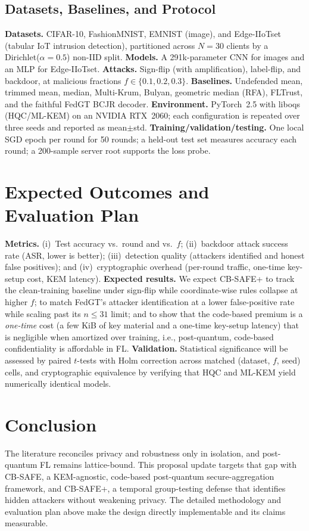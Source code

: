 \documentclass[conference]{IEEEtran}
\begin{document}
\subsection{Datasets, Baselines, and Protocol}
\textbf{Datasets.} CIFAR-10, FashionMNIST, EMNIST (image), and Edge-IIoTset (tabular
IoT intrusion detection), partitioned across $N{=}30$ clients by a
Dirichlet($\alpha{=}0.5$) non-IID split. \textbf{Models.} A 291k-parameter CNN for
images and an MLP for Edge-IIoTset. \textbf{Attacks.} Sign-flip (with amplification),
label-flip, and backdoor, at malicious fractions $f\in\{0.1,0.2,0.3\}$.
\textbf{Baselines.} Undefended mean, trimmed mean, median, Multi-Krum, Bulyan,
geometric median (RFA), FLTrust, and the faithful FedGT BCJR decoder.
\textbf{Environment.} PyTorch~2.5 with liboqs (HQC/ML-KEM) on an NVIDIA RTX~2060;
each configuration is repeated over three seeds and reported as mean$\pm$std.
\textbf{Training/validation/testing.} One local SGD epoch per round for 50 rounds; a
held-out test set measures accuracy each round; a 200-sample server root supports the
loss probe.

\section{Expected Outcomes and Evaluation Plan}
\textbf{Metrics.} (i)~Test accuracy vs.\ round and vs.\ $f$; (ii)~backdoor attack
success rate (ASR, lower is better); (iii)~detection quality (attackers identified
and honest false positives); and (iv)~cryptographic overhead (per-round traffic,
one-time key-setup cost, KEM latency). \textbf{Expected results.} We expect CB-SAFE+
to track the clean-training baseline under sign-flip while coordinate-wise rules
collapse at higher $f$; to match FedGT's attacker identification at a lower
false-positive rate while scaling past its $n\!\le\!31$ limit; and to show that the
code-based premium is a \emph{one-time} cost (a few KiB of key material and a
one-time key-setup latency) that is negligible when amortized over training, i.e.,
post-quantum, code-based confidentiality is affordable in FL. \textbf{Validation.}
Statistical significance will be assessed by paired $t$-tests with Holm correction
across matched (dataset, $f$, seed) cells, and cryptographic equivalence by verifying
that HQC and ML-KEM yield numerically identical models.

\section{Conclusion}
The literature reconciles privacy and robustness only in isolation, and post-quantum
FL remains lattice-bound. This proposal update targets that gap with CB-SAFE, a
KEM-agnostic, code-based post-quantum secure-aggregation framework, and CB-SAFE+, a
temporal group-testing defense that identifies hidden attackers without weakening
privacy. The detailed methodology and evaluation plan above make the design directly
implementable and its claims measurable.
\end{document}
